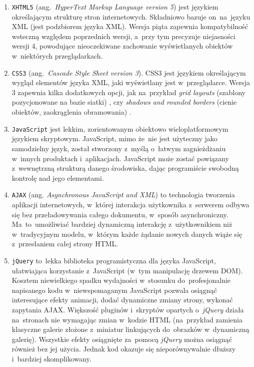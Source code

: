 \begin{enumerate}
  \item \texttt{XHTML5} \cite{html5doc} (ang.~\textit{HyperText Markup Language version 5}) jest językiem określającym strukturę stron internetowych. Składniowo bazuje on~na~języku XML (jest podzbiorem języka XML). Wersja piąta zapewnia kompatybilność wsteczną względem poprzednich wersji, a~przy tym precyzuje niejasności wersji 4, powodujące nieoczekiwane zachowanie wyświetlanych obiektów w~niektórych przeglądarkach.
  \item \texttt{CSS3} \cite{css3doc} (ang.~\textit{Cascade Style Sheet version 3}). CSS3 jest językiem określającym wygląd elementów języka XML, jaki wyświetlany jest w~przeglądarce. Wersja 3 zapewnia kilka dodatkowych opcji, jak na~przykład \textit{grid layouts} (szablony pozycjonowane na bazie siatki) \cite{css.grid}, czy \textit{shadows and rounded borders} (cienie obiektów, zaokrąglenia obramowania) \cite{css.shadow}.
  \item \texttt{JavaScript} jest lekkim, zorientowanym obiektowo wieloplatformowym językiem skryptowym. JavaScript, mimo że~nie jest użyteczny jako samodzielny język, został stworzony z~myślą o~łatwym zagnieżdżaniu w~innych produktach i~aplikacjach. JavaScript może zostać powiązany z~wewnętrzną strukturą danego środowiska, dając programiście swobodną kontrolę nad jego elementami.
  \item \texttt{AJAX} (ang. \textit{Asynchronous JavaScript and XML}) to technologia tworzenia aplikacji internetowych, w~której interakcja użytkownika z~serwerem odbywa się bez przeładowywania całego dokumentu, w~sposób asynchroniczny. Ma~to~umożliwiać bardziej dynamiczną interakcję z~użytkownikiem niż w~tradycyjnym modelu, w~którym każde żądanie nowych danych wiąże się z~przesłaniem całej strony HTML.
  \item \texttt{jQuery}\cite{jquery} to~lekka biblioteka programistyczna dla języka JavaScript, ułatwiająca korzystanie z~JavaScript (w~tym manipulację drzewem DOM). Kosztem niewielkiego spadku wydajności w~stosunku do~profesjonalnie napisanego kodu w~niewspomaganym JavaScript pozwala osiągnąć interesujące efekty animacji, dodać dynamiczne zmiany strony, wykonać zapytania AJAX. Większość pluginów i~skryptów opartych o~\textit{jQuery} działa na~stronach nie wymagając zmian w~kodzie HTML (na~przykład zamienia klasyczne galerie złożone z~miniatur linkujących do~obrazków w~dynamiczną galerię). Wszystkie efekty osiągnięte za~pomocą \textit{jQuery} można osiągnąć również bez jej użycia. Jednak kod okazuje się nieporównywalnie dłuższy i~bardziej skomplikowany.
\end{enumerate}
